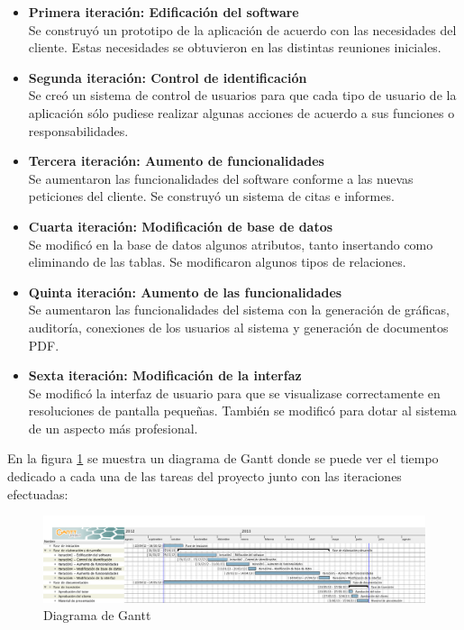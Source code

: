 \documentclass[a4paper,12pt]{article}
\begin{document}
\begin{itemize}
\item \textbf{Primera iteración: Edificación del software}\\
Se construyó un prototipo de la aplicación de acuerdo con las necesidades del cliente. Estas necesidades se obtuvieron en las distintas reuniones iniciales.
\item \textbf{Segunda iteración: Control de identificación}\\
Se creó un sistema de control de usuarios para que cada tipo de usuario de la aplicación sólo pudiese realizar algunas acciones de acuerdo a sus funciones o responsabilidades.
\item \textbf{Tercera iteración: Aumento de funcionalidades}\\
Se aumentaron las funcionalidades del software conforme a las nuevas peticiones del cliente. Se construyó un sistema de citas e informes.
\item \textbf{Cuarta iteración: Modificación de base de datos}\\
Se modificó en la base de datos algunos atributos, tanto insertando como eliminando de las tablas. Se modificaron algunos tipos de relaciones.
\item \textbf{Quinta iteración: Aumento de las funcionalidades}\\
Se aumentaron las funcionalidades del sistema con la generación de gráficas, auditoría, conexiones de los usuarios al sistema y generación de documentos PDF.
\item \textbf{Sexta iteración: Modificación de la interfaz}\\
Se modificó la interfaz de usuario para que se visualizase correctamente en resoluciones de pantalla pequeñas. También se modificó para dotar al sistema de un aspecto más profesional.
\end{itemize}

\noindent En la figura \ref{gannt} se muestra un diagrama de Gantt donde se puede ver el tiempo dedicado a cada una de las tareas del proyecto junto con las iteraciones efectuadas: 

\begin{figure}[!ht]
  \centering
    \includegraphics[totalheight=6cm,width=16cm]{gantt}
  \caption{Diagrama de Gantt}
  \label{gannt}
\end{figure}
\end{document}
